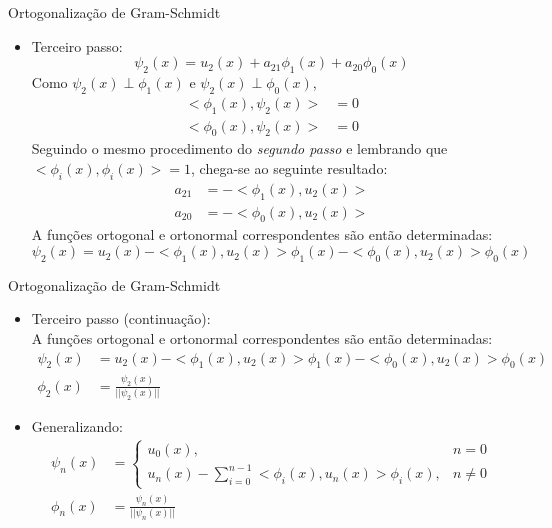      \begin{slide}[toc=]{Ortogonalização de Gram-Schmidt}
	     \begin{itemize}
		     \item Terceiro passo:
			     \begin{equation*}
				     \psi_2(x) = u_2(x)+a_{21}\phi_1(x)+a_{20}\phi_0(x)
  			     \end{equation*}
			     Como $\psi_2(x)\perp \phi_1(x)$ e $\psi_2(x)\perp \phi_0(x)$,
			     \begin{align*}
				     <\phi_1(x),\psi_2(x)> &= 0\\
				     <\phi_0(x),\psi_2(x)> &= 0
			     \end{align*}
			     Seguindo o mesmo procedimento do \emph{segundo passo} e lembrando que $<\phi_i(x),\phi_i(x)> = 1$, chega-se ao seguinte resultado:
			     \begin{align*}
				     a_{21} &= -<\phi_1(x),u_2(x)>\\
				     a_{20} &= -<\phi_0(x),u_2(x)>
			     \end{align*}
			     A funções ortogonal e ortonormal correspondentes são então determinadas:
			     \begin{equation*}
				     \psi_2(x) = u_2(x) - <\phi_1(x),u_2(x)>\phi_1(x)- <\phi_0(x),u_2(x)>\phi_0(x)%
			     \end{equation*}
	     \end{itemize}
     \end{slide}
     
     \begin{slide}[toc=]{Ortogonalização de Gram-Schmidt}
	     \begin{itemize}
		     \item Terceiro passo (continuação):\\
			     A funções ortogonal e ortonormal correspondentes são então determinadas:
			     \begin{align*}
				     \psi_2(x) &= u_2(x) - <\phi_1(x),u_2(x)>\phi_1(x)- <\phi_0(x),u_2(x)>\phi_0(x)\\
				     \phi_2(x) &= \frac{\psi_2(x)}{||\psi_2(x)||}
			     \end{align*}
		     \item Generalizando:
			     \begin{align*}
				     \psi_n(x) &= \begin{cases}
					       u_0(x),& n = 0\\
					       u_n(x) - \sum_{i = 0}^{n-1}<\phi_i(x),u_n(x)>\phi_i(x),& n\neq 0
				     \end{cases}\\
				     \phi_n(x) &= \frac{\psi_n(x)}{||\psi_n(x)||}
			     \end{align*}
	     \end{itemize}
     \end{slide}

